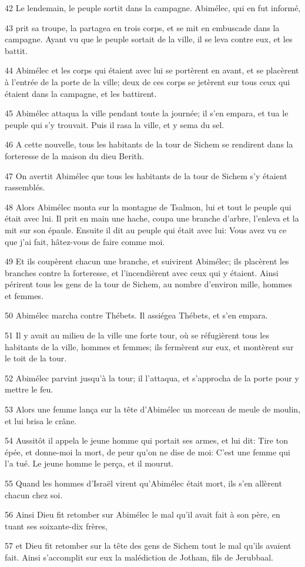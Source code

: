 \par 42 Le lendemain, le peuple sortit dans la campagne. Abimélec, qui en fut informé,
\par 43 prit sa troupe, la partagea en trois corps, et se mit en embuscade dans la campagne. Ayant vu que le peuple sortait de la ville, il se leva contre eux, et les battit.
\par 44 Abimélec et les corps qui étaient avec lui se portèrent en avant, et se placèrent à l'entrée de la porte de la ville; deux de ces corps se jetèrent sur tous ceux qui étaient dans la campagne, et les battirent.
\par 45 Abimélec attaqua la ville pendant toute la journée; il s'en empara, et tua le peuple qui s'y trouvait. Puis il rasa la ville, et y sema du sel.
\par 46 A cette nouvelle, tous les habitants de la tour de Sichem se rendirent dans la forteresse de la maison du dieu Berith.
\par 47 On avertit Abimélec que tous les habitants de la tour de Sichem s'y étaient rassemblés.
\par 48 Alors Abimélec monta sur la montagne de Tsalmon, lui et tout le peuple qui était avec lui. Il prit en main une hache, coupa une branche d'arbre, l'enleva et la mit sur son épaule. Ensuite il dit au peuple qui était avec lui: Vous avez vu ce que j'ai fait, hâtez-vous de faire comme moi.
\par 49 Et ils coupèrent chacun une branche, et suivirent Abimélec; ils placèrent les branches contre la forteresse, et l'incendièrent avec ceux qui y étaient. Ainsi périrent tous les gens de la tour de Sichem, au nombre d'environ mille, hommes et femmes.
\par 50 Abimélec marcha contre Thébets. Il assiégea Thébets, et s'en empara.
\par 51 Il y avait au milieu de la ville une forte tour, où se réfugièrent tous les habitants de la ville, hommes et femmes; ils fermèrent sur eux, et montèrent sur le toit de la tour.
\par 52 Abimélec parvint jusqu'à la tour; il l'attaqua, et s'approcha de la porte pour y mettre le feu.
\par 53 Alors une femme lança sur la tête d'Abimélec un morceau de meule de moulin, et lui brisa le crâne.
\par 54 Aussitôt il appela le jeune homme qui portait ses armes, et lui dit: Tire ton épée, et donne-moi la mort, de peur qu'on ne dise de moi: C'est une femme qui l'a tué. Le jeune homme le perça, et il mourut.
\par 55 Quand les hommes d'Israël virent qu'Abimélec était mort, ils s'en allèrent chacun chez soi.
\par 56 Ainsi Dieu fit retomber sur Abimélec le mal qu'il avait fait à son père, en tuant ses soixante-dix frères,
\par 57 et Dieu fit retomber sur la tête des gens de Sichem tout le mal qu'ils avaient fait. Ainsi s'accomplit sur eux la malédiction de Jotham, fils de Jerubbaal.

